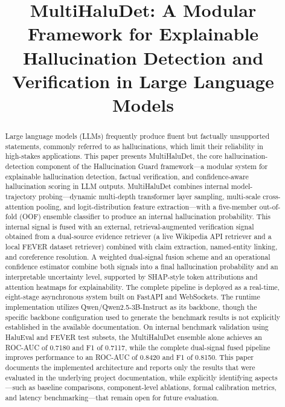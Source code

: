 \documentclass[conference]{IEEEtran}
\begin{document}
\title{MultiHaluDet: A Modular Framework for Explainable Hallucination Detection and Verification in Large Language Models}

\author{
}

\maketitle

\begin{abstract}
Large language models (LLMs) frequently produce fluent but factually unsupported statements, commonly referred to as hallucinations, which limit their reliability in high-stakes applications. This paper presents MultiHaluDet, the core hallucination-detection component of the Hallucination Guard framework---a modular system for explainable hallucination detection, factual verification, and confidence-aware hallucination scoring in LLM outputs. MultiHaluDet combines internal model-trajectory probing---dynamic multi-depth transformer layer sampling, multi-scale cross-attention pooling, and logit-distribution feature extraction---with a five-member out-of-fold (OOF) ensemble classifier to produce an internal hallucination probability. This internal signal is fused with an external, retrieval-augmented verification signal obtained from a dual-source evidence retriever (a live Wikipedia API retriever and a local FEVER dataset retriever) combined with claim extraction, named-entity linking, and coreference resolution. A weighted dual-signal fusion scheme and an operational confidence estimator combine both signals into a final hallucination probability and an interpretable uncertainty level, supported by SHAP-style token attributions and attention heatmaps for explainability. The complete pipeline is deployed as a real-time, eight-stage asynchronous system built on FastAPI and WebSockets. The runtime implementation utilizes Qwen/Qwen2.5-3B-Instruct as its backbone, though the specific backbone configuration used to generate the benchmark results is not explicitly established in the available documentation. On internal benchmark validation using HaluEval and FEVER test subsets, the MultiHaluDet ensemble alone achieves an ROC-AUC of 0.7180 and F1 of 0.7117, while the complete dual-signal fused pipeline improves performance to an ROC-AUC of 0.8420 and F1 of 0.8150. This paper documents the implemented architecture and reports only the results that were evaluated in the underlying project documentation, while explicitly identifying aspects---such as baseline comparisons, component-level ablations, formal calibration metrics, and latency benchmarking---that remain open for future evaluation.
\end{abstract}
\end{document}
